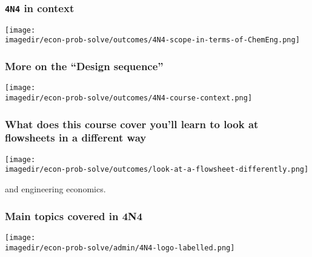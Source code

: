 \begin{frame}\frametitle{\texttt{4N4} in context}
	\begin{center}
		\texttt{[image: \\imagedir/econ-prob-solve/outcomes/4N4-scope-in-terms-of-ChemEng.png]}
	\end{center}
\end{frame}

\begin{frame}\frametitle{More on the ``Design sequence''}
	\begin{center}
		\texttt{[image: \\imagedir/econ-prob-solve/outcomes/4N4-course-context.png]}
	\end{center}
\end{frame}

\begin{frame}\frametitle{What does this course cover {\scriptsize you'll learn to look at flowsheets in a different way}}
	\begin{center}
		\texttt{[image: \\imagedir/econ-prob-solve/outcomes/look-at-a-flowsheet-differently.png]}
	\end{center}
	and engineering economics.
\end{frame}


\begin{frame}\frametitle{Main topics covered in 4N4}
	\begin{center}
		\texttt{[image: \\imagedir/econ-prob-solve/admin/4N4-logo-labelled.png]}
	\end{center}
	\vspace{-12pt}
	{\small {\color{brown}{This is a unique course: not taught anywhere else in Canada.}}}
\end{frame}

